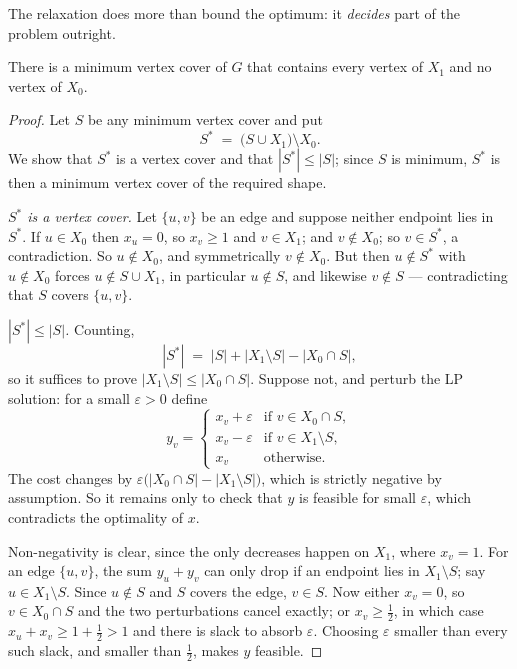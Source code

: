 The relaxation does more than bound the optimum: it \emph{decides} part of the
problem outright.

\begin{theorem}\label{thm:nemhauser-trotter}
There is a minimum vertex cover of $G$ that contains every vertex of $X_1$ and
no vertex of $X_0$.
\end{theorem}

\begin{proof}
Let $S$ be any minimum vertex cover and put
\[ S^{*} \;=\; \bigl(S \cup X_1\bigr) \setminus X_0 . \]
We show that $S^{*}$ is a vertex cover and that $|S^{*}| \le |S|$; since $S$ is
minimum, $S^{*}$ is then a minimum vertex cover of the required shape.

\emph{$S^{*}$ is a vertex cover.} Let $\{u,v\}$ be an edge and suppose neither
endpoint lies in $S^{*}$. If $u \in X_0$ then $x_u = 0$, so $x_v \ge 1$ and
$v \in X_1$; and $v \notin X_0$; so $v \in S^{*}$, a contradiction. So
$u \notin X_0$, and symmetrically $v \notin X_0$. But then $u \notin S^{*}$ with
$u \notin X_0$ forces $u \notin S \cup X_1$, in particular $u \notin S$, and
likewise $v \notin S$ --- contradicting that $S$ covers $\{u,v\}$.

\emph{$|S^{*}| \le |S|$.} Counting,
\[ |S^{*}| \;=\; |S| + \bigl|X_1 \setminus S\bigr|
                  - \bigl|X_0 \cap S\bigr|, \]
so it suffices to prove $|X_1 \setminus S| \le |X_0 \cap S|$. Suppose not, and
perturb the LP solution: for a small $\varepsilon > 0$ define
\[ y_v = \begin{cases}
     x_v + \varepsilon & \text{if } v \in X_0 \cap S, \\
     x_v - \varepsilon & \text{if } v \in X_1 \setminus S, \\
     x_v & \text{otherwise.}
   \end{cases} \]
The cost changes by $\varepsilon\bigl(|X_0 \cap S| - |X_1 \setminus S|\bigr)$,
which is strictly negative by assumption. So it remains only to check that $y$
is feasible for small $\varepsilon$, which contradicts the optimality of $x$.

Non-negativity is clear, since the only decreases happen on $X_1$, where
$x_v = 1$. For an edge $\{u,v\}$, the sum $y_u + y_v$ can only drop if an
endpoint lies in $X_1 \setminus S$; say $u \in X_1 \setminus S$. Since $u
\notin S$ and $S$ covers the edge, $v \in S$. Now either $x_v = 0$, so
$v \in X_0 \cap S$ and the two perturbations cancel exactly; or $x_v \ge
\frac12$, in which case $x_u + x_v \ge 1 + \frac12 > 1$ and there is slack to
absorb $\varepsilon$. Choosing $\varepsilon$ smaller than every such slack, and
smaller than $\frac12$, makes $y$ feasible.
\end{proof}

